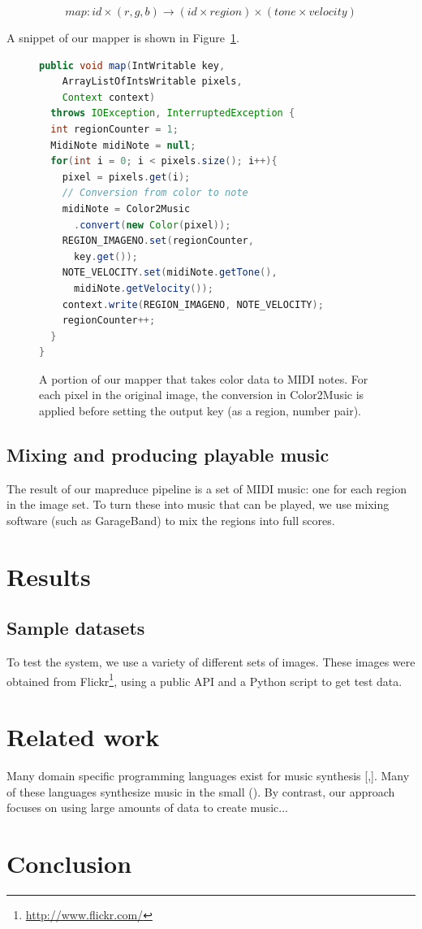 \documentclass[10pt, conference, compsocconf]{IEEEtran}
\newcommand{\code}[1]{\textsf{\small #1}}
\begin{document}
\[
  map : id \times (r,g,b) \to (id \times region) \times (tone \times velocity)
\]

A snippet of our mapper is shown in
Figure~\ref{figure:colortomusic-mapper}.  

\begin{figure}
\label{figure:colortomusic-mapper}
\begin{lstlisting}[language=Java]
public void map(IntWritable key, 
    ArrayListOfIntsWritable pixels,
    Context context)
  throws IOException, InterruptedException {
  int regionCounter = 1;
  MidiNote midiNote = null;
  for(int i = 0; i < pixels.size(); i++){
    pixel = pixels.get(i);
    // Conversion from color to note
    midiNote = Color2Music
      .convert(new Color(pixel));
    REGION_IMAGENO.set(regionCounter,
      key.get());
    NOTE_VELOCITY.set(midiNote.getTone(),
      midiNote.getVelocity());
    context.write(REGION_IMAGENO, NOTE_VELOCITY);
    regionCounter++;
  }
}
\end{lstlisting}
\caption{A portion of our mapper that takes color data to MIDI notes.
  For each pixel in the original image, the conversion in
  \code{Color2Music} is applied before setting the output key (as a
  region, number pair).}
\end{figure}



\subsection{Mixing and producing playable music}

The result of our mapreduce pipeline is a set of MIDI music: one for
each region in the image set.  To turn these into music that can be
played, we use mixing software (such as GarageBand) to mix the regions
into full scores.

\section{Results}

\subsection{Sample datasets}

To test the system, we use a variety of different sets of images.
These images were obtained from
Flickr\footnote{\url{http://www.flickr.com/}}, using a public API and
a Python script \cite{flickerpy} to get test data.

\section{Related work}

Many domain specific programming languages exist for music synthesis
[\cite{haskore},\cite{lilypad}].  Many of these languages synthesize
music in the small ().  By contrast, our approach focuses on using
large amounts of data to create music...

\section{Conclusion}



\end{document}
